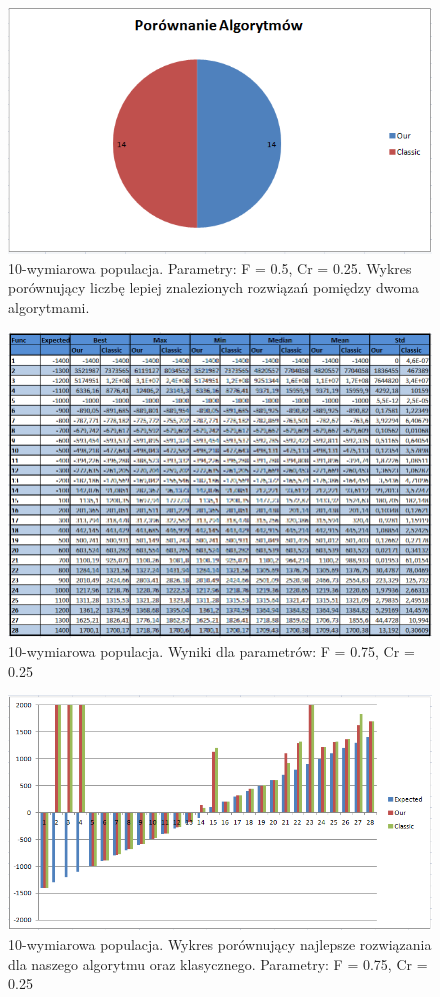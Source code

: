 \documentclass[a4paper]{article}
\begin{document}
\begin{figure}[!h]
\centering
\includegraphics[width=\textwidth]{F5Cr25L10statystyka.png}
\caption{10-wymiarowa populacja. Parametry: F = 0.5, Cr = 0.25. Wykres porównujący liczbę lepiej znalezionych rozwiązań pomiędzy dwoma algorytmami.}
\end{figure}

\begin{figure}[!h]
\centering
\includegraphics[width=\textwidth]{F75Cr25L10tab.png}
\caption{10-wymiarowa populacja. Wyniki dla parametrów: F = 0.75, Cr = 0.25}
\end{figure}

\begin{figure}[!h]
\centering
\includegraphics[width=\textwidth]{F75Cr25L10chart.png}
\caption{10-wymiarowa populacja. Wykres porównujący najlepsze rozwiązania dla naszego algorytmu oraz klasycznego. Parametry: F = 0.75, Cr = 0.25}
\end{figure}
\end{document}
